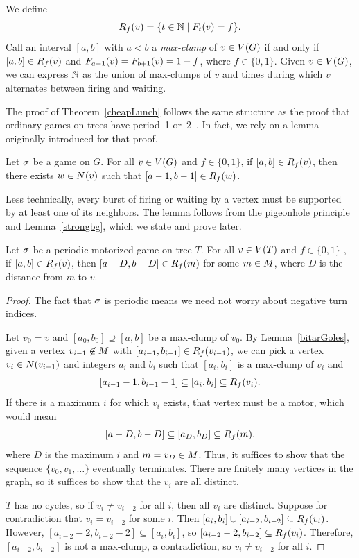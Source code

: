 We define
\[
  \pat{v}{f} = \set{t \in \nats}{\firing{v}{t} = f}.
\]
Call an interval $[a, b]$ with $a < b$ a \emph{max-clump} of $v \in \V$ if and
only if $[a, b] \in \pat{v}{f}$ and $\firing{v}{a-1} = \firing{v}{b+1} = 1-f$,
where $f \in \{0,1\}$. Given $v \in \V$, we can express $\nats$ as the union of
max-clumps of $v$ and times during which $v$ alternates between firing and
waiting.

The proof of Theorem~\ref{cheapLunch} follows the same structure as the proof
that ordinary games on trees have period~1 or~2~\cite{bitarGoles}. In fact, we
rely on a lemma originally introduced for that proof.

\begin{lem} \label{bitarGoles}
Let $\s$ be a game on $G$. For all $v \in \V$ and $f \in \{0,1\}$, if $[a, b]
\in \pat{v}{f}$, then there exists $w \in \N{v}$ such that $[a-1, b-1] \in
\pat{w}{f}$.
\end{lem}

Less technically, every burst of firing or waiting by a vertex must be
supported by at least one of its neighbors. The lemma follows from the
pigeonhole principle and Lemma~\ref{strongbg}, which we state and prove later.

\begin{thm} \label{cheapLunch}
Let $\s$ be a periodic motorized game on tree $T$. For all $v \in \V[T]$ and $f
\in \{0,1\}$ , if $[a, b] \in \pat{v}{f}$, then $[a-D, b-D] \in \pat{m}{f}$ for
some $m \in \mots$, where $D$ is the distance from $m$ to $v$.
\end{thm}

\begin{proof}
The fact that $\s$ is periodic means we need not worry about negative turn
indices.

Let $v_0 = v$ and $[a_0, b_0] \supseteq [a, b]$ be a max-clump of $v_0$. By
Lemma~\ref{bitarGoles}, given a vertex $v_{i-1} \not\in \mots$ with $[a_{i-1},
  b_{i-1}] \in \pat{v_{i-1}}{f}$, we can pick a vertex $v_i \in \N{v_{i-1}}$
and integers $a_i$ and $b_i$ such that $[a_i, b_i]$ is a max-clump of $v_i$ and
\[
  [a_{i-1} - 1, b_{i-1} - 1] \subseteq [a_i, b_i] \subseteq \pat{v_i}{f}.
\]
If there is a maximum $i$ for which $v_i$ exists, that vertex must be a motor,
which would mean
\[
  [a-D, b-D] \subseteq [a_D, b_D] \subseteq \pat{m}{f},
\]
where $D$ is the maximum $i$ and $m = v_D \in \mots$. Thus, it suffices to show
that the sequence $\{v_0, v_1, \ldots\}$ eventually terminates. There are
finitely many vertices in the graph, so it suffices to show that the $v_i$ are
all distinct.

$T$ has no cycles, so if $v_i \neq v_{i-2}$ for all $i$, then all $v_i$ are
distinct. Suppose for contradiction that $v_i = v_{i-2}$ for some $i$. Then
$[a_i, b_i] \cup [a_{i-2}, b_{i-2}] \subseteq \pat{v_i}{f}$. However, $[a_{i-2}
  - 2, b_{i-2} - 2] \subseteq [a_i, b_i]$, so $[a_{i-2} - 2, b_{i-2}] \subseteq
\pat{v_i}{f}$. Therefore, $[a_{i-2}, b_{i-2}]$ is not a max-clump, a
contradiction, so $v_i \neq v_{i-2}$ for all $i$.
\end{proof}

